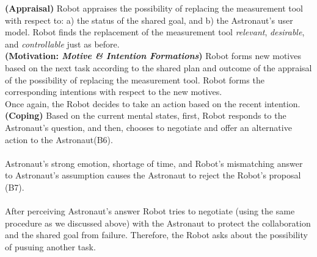 \noindent\textbf{(Appraisal)} Robot appraises the possibility of
replacing the measurement tool with respect to: a) the status of the shared
goal, and b) the Astronaut's user model. Robot finds the replacement of the
measurement tool \textit{relevant}, \textit{desirable}, and
\textit{controllable} just as before.\\

\noindent\textbf{(Motivation: \textit{Motive \& Intention Formations})} Robot
forms new motives based on the next task according to the shared plan and
outcome of the appraisal of the possibility of replacing the measurement tool.
Robot forms the corresponding intentions with respect to the new motives.\\

Once again, the Robot decides to take an action based on the recent intention.\\

\noindent\textbf{(Coping)} Based on the current mental states, first, Robot
responds to the Astronaut's question, and then, chooses to negotiate and offer
an alternative action to the Astronaut(B6).\\

\noindent{}\\

Astronaut's strong emotion, shortage of time, and Robot's mismatching answer to
Astronaut's assumption causes the Astronaut to reject the Robot's proposal
(B7).\\

\noindent{}\\

After perceiving Astronaut's answer Robot tries to negotiate (using the same
procedure as we discussed above) with the Astronaut to protect the collaboration
and the shared goal from failure. Therefore, the Robot asks about the
possibility of pusuing another task.\\

\noindent{}\\

